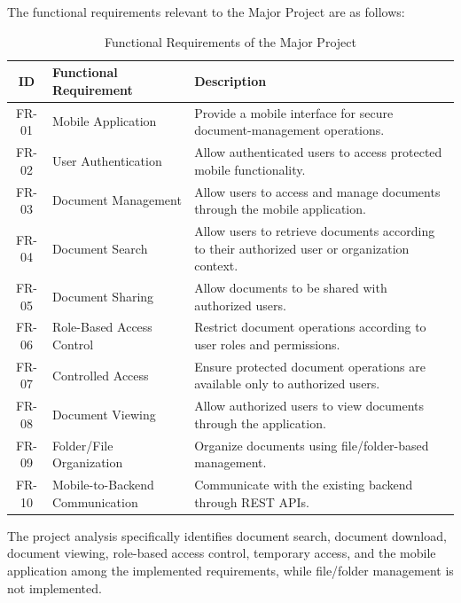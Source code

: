 \documentclass[12pt]{article}
\begin{document}
The functional requirements relevant to the Major Project are as follows:
\begin{table}[H]
\centering
\caption{Functional Requirements of the Major Project}
\label{tab:functional_requirements}
\renewcommand{\arraystretch}{1.35}
\begin{tabular}{|c|p{4.0cm}|p{8.0cm}|}
\hline
\textbf{ID} &
\textbf{Functional Requirement} &
\textbf{Description} \\ \hline

FR-01 &
Mobile Application &
Provide a mobile interface for secure document-management operations. \\ \hline

FR-02 &
User Authentication &
Allow authenticated users to access protected mobile functionality. \\ \hline

FR-03 &
Document Management &
Allow users to access and manage documents through the mobile application. \\ \hline

FR-04 &
Document Search &
Allow users to retrieve documents according to their authorized user or organization context. \\ \hline

FR-05 &
Document Sharing &
Allow documents to be shared with authorized users. \\ \hline

FR-06 &
Role-Based Access Control &
Restrict document operations according to user roles and permissions. \\ \hline

FR-07 &
Controlled Access &
Ensure protected document operations are available only to authorized users. \\ \hline

FR-08 &
Document Viewing &
Allow authorized users to view documents through the application. \\ \hline

FR-09 &
Folder/File Organization &
Organize documents using file/folder-based management. \\ \hline

FR-10 &
Mobile-to-Backend Communication &
Communicate with the existing backend through REST APIs. \\ \hline

\end{tabular}
\end{table}

The project analysis specifically identifies document search, document download, document viewing, role-based access control, temporary access, and the mobile application among the implemented requirements, while file/folder management is not implemented.
\end{document}

